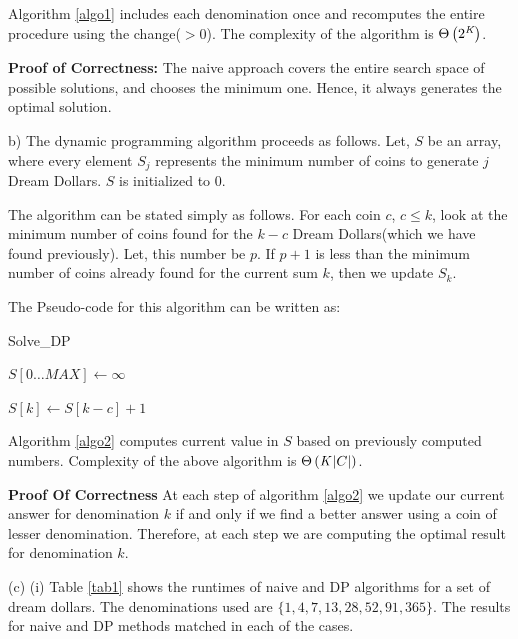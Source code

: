 \documentclass[assign]{article}
\begin{document}
Algorithm \ref{algo1} includes each denomination once and recomputes the entire procedure using the change($> 0$). The complexity of the algorithm is $\Theta \left( 2^{\emph{K} }\right)$.

\noindent \textbf{Proof of Correctness:} The naive approach covers the entire search space of possible solutions, and chooses the minimum one. Hence, it always generates the optimal solution. 


b) The dynamic programming algorithm proceeds as follows. Let, $S$ be an array, where every element $S_j$ represents the minimum number of coins to generate $j$ Dream Dollars. $S$ is initialized to 0. 

The algorithm can be stated simply as follows. For each coin $c$, $c \le k$, look at the minimum number of coins found for the $k-c$ Dream Dollars(which we have found previously). Let, this number be $p$. If $p+1$ is less than the minimum number of coins already found for the current sum $k$, then we update $S_k$.

The Pseudo-code for this algorithm can be written as:

\begin{algorithm}[H]
  \caption{Solve\_DP}
   $S[0 \ldots MAX] \gets \infty$  
   
    {
      {
         {
             $S[k] \gets S[k-c] + 1$\;
        }
     }
   } 
\label{algo2}
\end{algorithm}


Algorithm \ref{algo2} computes current value in $S$ based on previously computed numbers. Complexity of 
the above algorithm is $\Theta \left( \emph{K}\left| C \right|\right)$. 

\textbf{Proof Of Correctness} At each step of algorithm \ref{algo2} we update our current answer for denomination $k$ if and only if we find a better answer using a coin of lesser denomination. Therefore, at each step we are computing the optimal result for denomination $k$.

(c) (i) Table \ref{tab1} shows the runtimes of naive and DP algorithms for a set of dream dollars. The denominations used are $\{ 1, 4, 7, 13, 28, 52, 91, 365\}$. The results for naive and DP methods matched in each of the cases.
\end{document}

